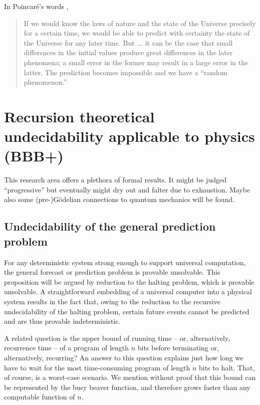 \documentclass[%
 reprint,
 showpacs,
 showkeys,
 preprintnumbers,
 amsmath,amssymb,
 aps,
 prl,
  longbibliography,
 ]{revtex4-1}
\begin{document}
In Poincar{\'e}'s words \cite[chapt.~4, sect.~2,  56--57]{poincare14},
\begin{quote}
{
If we would know the laws of nature and the state of the Universe precisely
for a certain time,
we would be able to predict with certainty
the state of the Universe for any later time.
But
$\ldots$
it can be the case that small differences in the initial values
produce great differences in the later phenomena;
a small error in the former may result in a large error in the latter.
The prediction becomes impossible and we have a ``random phenomenon.''}
\end{quote}


\section{Recursion theoretical undecidability applicable to physics (BBB+)}

This research area offers a plethora of formal results.
It might be judged ``progressive'' but eventually
might dry out and falter due to exhaustion.
Maybe also some (pre-)G\"odelian connections to quantum mechanics will be found.

\subsection{Undecidability of the general prediction problem}

For any deterministic system strong enough to support
universal computation,  the general forecast or prediction
problem is provable unsolvable.
This proposition will be argued by reduction to the halting problem, which is provable unsolvable.
A straightforward embedding of a universal computer
into a physical system results in the fact that,
owing to the reduction to the recursive undecidability of the halting problem,
certain future events cannot be predicted
and are thus provable indeterministic.

A related question is the upper bound of running time  --  or,
alternatively, recurrence time  --  of a program of length $n$ bits before
terminating  or, alternatively, recurring?
An answer to this question explains just how long we have to
wait for the most time-consuming program of length $n$ bits to
halt. That, of course, is a worst-case scenario.
We mention without proof \citep{chaitin-ACM,chaitin-bb}  that
this bound can be represented by the busy beaver function, and therefore grows faster than any computable
function of $n$.
\end{document}
